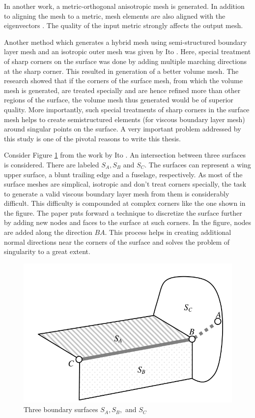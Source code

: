 In another work, a metric-orthogonal anisotropic mesh is generated. In addition to aligning the mesh to a metric, mesh elements are also aligned with the eigenvectors \cite{loseille20093d}. The quality of the input metric strongly affects the output mesh.

Another method which generates a hybrid mesh using semi-structured boundary layer mesh and an isotropic outer mesh was given by Ito \etal \cite{ito2007multiple}. Here, special treatment of sharp corners on the surface was done by adding multiple marching directions at the sharp corner. This resulted in generation of a better volume mesh. The research showed that if the corners of the surface mesh, from which the volume mesh is generated, are treated specially and are hence refined more than other regions of the surface, the volume mesh thus generated would be of superior quality. More importantly, such special treatments of sharp corners in the surface mesh helps to create semistructured elements (for viscous boundary layer mesh) around singular points on the surface. A very important problem addressed by this study is one of the pivotal reasons to write this thesis.

Consider Figure \ref{fig-cornerIto} from the work by Ito \etal \cite{ito2007multiple}. An intersection between three surfaces is considered. There are labeled $S_A, S_B$ and $S_C$. The surfaces can represent a wing upper surface, a blunt trailing edge and a fuselage, respectively. As most of the surface meshes are simplical, isotropic and don't treat corners specially, the task to generate a valid viscous boundary layer mesh from them is considerably difficult. This difficulty is compounded at complex corners like the one shown in the figure. The paper puts forward a technique to discretize the surface further by adding new nodes and faces to the surface at such corners. In the figure, nodes are added along the direction $BA$. This process helps in creating additional normal directions near the corners of the surface and solves the problem of singularity to a great extent.

\begin{figure}
	\centering
	\includegraphics[width=0.8\linewidth]{img/intro/lit/cornerIto.png}
	\caption{Three boundary surfaces $S_A, S_B, $ and $S_C$ \cite{ito2007multiple}}
	\label{fig-cornerIto}
\end{figure}

